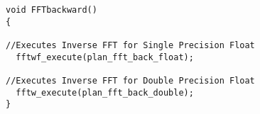 \lstset{framesep=-10pt, xleftmargin=-10pt}
\begin{lstlisting}[caption={FHEW: FFT Backward Function},label={listing:3.8.5}]
void FFTbackward()
{

//Executes Inverse FFT for Single Precision Float
  fftwf_execute(plan_fft_back_float); 
 
//Executes Inverse FFT for Double Precision Float
  fftw_execute(plan_fft_back_double); 
}
\end{lstlisting}



